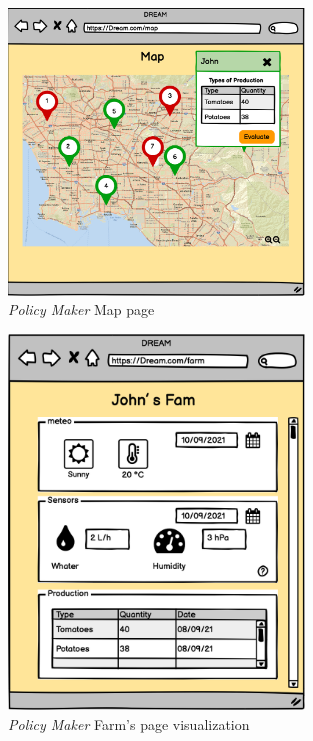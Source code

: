 \begin{figure}[H]
    \begin{center}
    \includegraphics[width=0.7\textwidth]{mocups/PMMap.png}
    \caption{\emph{Policy Maker} Map page}
    \label{fig:sequence1}
    \end{center}
\end{figure}

\begin{figure}[H]
    \begin{center}
    \includegraphics[width=0.7\textwidth]{mocups/PMFarm.png}
    \caption{\emph{Policy Maker} Farm's page visualization}
    \label{fig:sequence1}
    \end{center}
\end{figure}

